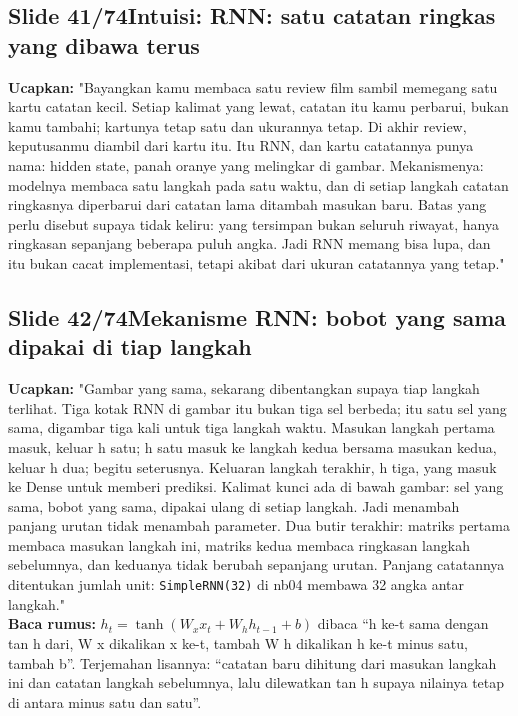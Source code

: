 \documentclass[11pt]{article}
\renewcommand{\framebox}[1]{\colorbox{acc!15}{\textcolor{acc}{\textbf{#1}}}}
\begin{document}
\subsection*{\framebox{Slide 41/74}\quad Intuisi: RNN: satu catatan ringkas yang dibawa terus}
\textbf{Ucapkan:} "Bayangkan kamu membaca satu review film sambil memegang satu kartu catatan kecil. Setiap kalimat yang lewat, catatan itu kamu perbarui, bukan kamu tambahi; kartunya tetap satu dan ukurannya tetap. Di akhir review, keputusanmu diambil dari kartu itu. Itu RNN, dan kartu catatannya punya nama: hidden state, panah oranye yang melingkar di gambar. Mekanismenya: modelnya membaca satu langkah pada satu waktu, dan di setiap langkah catatan ringkasnya diperbarui dari catatan lama ditambah masukan baru. Batas yang perlu disebut supaya tidak keliru: yang tersimpan bukan seluruh riwayat, hanya ringkasan sepanjang beberapa puluh angka. Jadi RNN memang bisa lupa, dan itu bukan cacat implementasi, tetapi akibat dari ukuran catatannya yang tetap."\\[2pt]

\subsection*{\framebox{Slide 42/74}\quad Mekanisme RNN: bobot yang sama dipakai di tiap langkah}
\textbf{Ucapkan:} "Gambar yang sama, sekarang dibentangkan supaya tiap langkah terlihat. Tiga kotak RNN di gambar itu bukan tiga sel berbeda; itu satu sel yang sama, digambar tiga kali untuk tiga langkah waktu. Masukan langkah pertama masuk, keluar h satu; h satu masuk ke langkah kedua bersama masukan kedua, keluar h dua; begitu seterusnya. Keluaran langkah terakhir, h tiga, yang masuk ke Dense untuk memberi prediksi. Kalimat kunci ada di bawah gambar: sel yang sama, bobot yang sama, dipakai ulang di setiap langkah. Jadi menambah panjang urutan tidak menambah parameter. Dua butir terakhir: matriks pertama membaca masukan langkah ini, matriks kedua membaca ringkasan langkah sebelumnya, dan keduanya tidak berubah sepanjang urutan. Panjang catatannya ditentukan jumlah unit: \texttt{SimpleRNN(32)} di nb04 membawa 32 angka antar langkah."\\[2pt]
\textbf{Baca rumus:} $h_t = \tanh\left(W_x x_t + W_h h_{t-1} + b\right)$ dibaca ``h ke-t sama dengan tan h dari, W x dikalikan x ke-t, tambah W h dikalikan h ke-t minus satu, tambah b''. Terjemahan lisannya: ``catatan baru dihitung dari masukan langkah ini dan catatan langkah sebelumnya, lalu dilewatkan tan h supaya nilainya tetap di antara minus satu dan satu''.\\[2pt]
\end{document}
